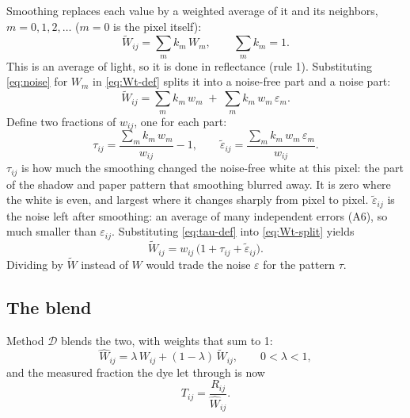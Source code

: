 \documentclass[11pt,letter]{article}
\newcommand{\MD}{\mathcal{D}}
\begin{document}
Smoothing replaces each value by a weighted average of it and its
neighbors, $m = 0, 1, 2, \dots$ ($m = 0$ is the pixel itself):
\begin{equation}
  \widetilde W_{ij} = \sum_m k_m\, W_m , \qquad \sum_m k_m = 1 .
  \label{eq:Wt-def}
\end{equation}
This is an average of light, so it is done in reflectance (rule 1).
Substituting \eqref{eq:noise} for $W_m$ in \eqref{eq:Wt-def} splits it
into a noise-free part and a noise part:
\begin{equation}
  \widetilde W_{ij} = \sum_m k_m\, w_m \;+\; \sum_m k_m\, w_m\,
  \varepsilon_m .
  \label{eq:Wt-split}
\end{equation}
Define two fractions of $w_{ij}$, one for each part:
\begin{equation}
  \tau_{ij} = \frac{\sum_m k_m\, w_m}{w_{ij}} - 1 , \qquad
  \widetilde\varepsilon_{ij} = \frac{\sum_m k_m\, w_m\,
  \varepsilon_m}{w_{ij}} .
  \label{eq:tau-def}
\end{equation}
$\tau_{ij}$ is how much the smoothing changed the noise-free white at this
pixel: the part of the shadow and paper pattern that smoothing blurred
away.  It is zero where the white is even, and largest where it changes
sharply from pixel to pixel.  $\widetilde\varepsilon_{ij}$ is the noise
left after smoothing: an average of many independent errors (A6), so much
smaller than $\varepsilon_{ij}$.  Substituting \eqref{eq:tau-def} into
\eqref{eq:Wt-split} yields
\begin{equation}
  \widetilde W_{ij} = w_{ij}\,\bigl(1 + \tau_{ij} +
  \widetilde\varepsilon_{ij}\bigr).
  \label{eq:Wt}
\end{equation}
Dividing by $\widetilde W$ instead of $W$ would trade the noise
$\varepsilon$ for the pattern $\tau$.

\subsection{The blend}

Method $\MD$ blends the two, with weights that sum to 1:
\begin{equation}
  \widehat W_{ij} = \lambda\, W_{ij} + (1 - \lambda)\, \widetilde W_{ij},
  \qquad 0 < \lambda < 1 ,
  \label{eq:What-def}
\end{equation}
and the measured fraction the dye let through is now
\begin{equation}
  T_{ij} = \frac{R_{ij}}{\widehat W_{ij}} .
  \label{eq:T5-def}
\end{equation}
\end{document}
